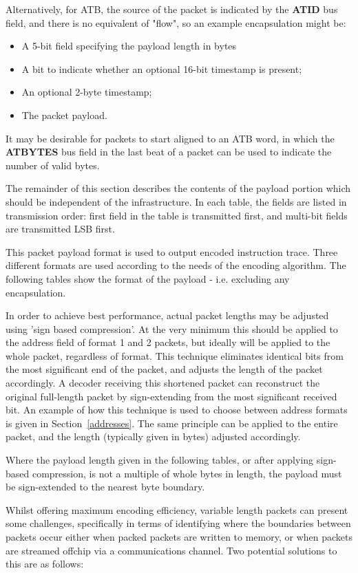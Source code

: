 Alternatively, for ATB, the source of the packet is indicated by the \textbf{ATID} bus field, and there is
no equivalent of "flow", so an example encapsulation might be:
\begin{itemize}
  \item A 5-bit field specifying the payload length in bytes
  \item A bit to indicate whether an optional 16-bit timestamp is present;
  \item An optional 2-byte timestamp;
  \item The packet payload.
\end{itemize}
It may be desirable for packets to start aligned to an ATB word, in which the \textbf{ATBYTES} bus field
in the last beat of a packet can be used to indicate the number of valid bytes.

The remainder of this section describes the contents of the payload
portion which should be independent of the infrastructure.  In each table, the fields are listed in
transmission order: first field in the table is transmitted first, and multi-bit fields are 
transmitted LSB first.

This packet payload format is used to output encoded instruction
trace.  Three different formats are used according to the needs of the
encoding algorithm. The following tables show the format of the
payload - i.e. excluding any encapsulation.

In order to achieve best performance, actual packet lengths may be adjusted using 'sign based compression'.
At the very minimum this should be applied to the address field of format 1 and 2 packets, but ideally will 
be applied to the whole packet, regardless of format.  This technique eliminates identical bits from the most 
significant end of the packet, and adjusts the length of the packet accordingly.  A decoder receiving this 
shortened packet can reconstruct the original full-length packet by sign-extending from the most significant
received bit.  An example of how this technique is used to choose between address formats is given in 
Section~\ref{addresses}.  The same principle can be applied to the entire packet, and the length (typically 
given in bytes) adjusted accordingly.

Where the payload length given in the following tables, or after applying sign-based compression, is not a 
multiple of whole bytes in length, the payload must be sign-extended to the nearest byte boundary.

Whilst offering maximum encoding efficiency, variable length packets can present some challenges,
specifically in terms of identifying where the boundaries between packets occur either when packed
packets are written to memory, or when packets are streamed offchip via a communications channel.  Two 
potential solutions to this are as follows:

